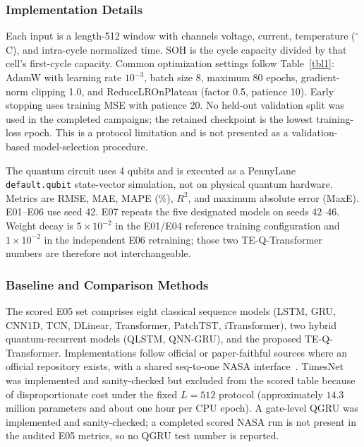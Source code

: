 \documentclass[a4paper,fleqn]{cas-sc}
\begin{document}
\subsubsection{Implementation Details}
\label{sec:implementation_details}

Each input is a length-512 window with channels voltage, current, temperature ($^\circ$C), and intra-cycle normalized time. SOH is the cycle capacity divided by that cell's first-cycle capacity. Common optimization settings follow Table~\ref{tbl1}: AdamW with learning rate $10^{-3}$, batch size 8, maximum 80 epochs, gradient-norm clipping 1.0, and ReduceLROnPlateau (factor 0.5, patience 10). Early stopping uses training MSE with patience 20. No held-out validation split was used in the completed campaigns; the retained checkpoint is the lowest training-loss epoch. This is a protocol limitation and is not presented as a validation-based model-selection procedure.

The quantum circuit uses 4 qubits and is executed as a PennyLane \mbox{\texttt{default.qubit}} state-vector simulation, not on physical quantum hardware. Metrics are RMSE, MAE, MAPE (\%), $R^2$, and maximum absolute error (MaxE). E01--E06 use seed 42. E07 repeats the five designated models on seeds 42--46. Weight decay is $5\times10^{-2}$ in the E01/E04 reference training configuration and $1\times10^{-2}$ in the independent E06 retraining; those two TE-Q-Transformer numbers are therefore not interchangeable.

\subsubsection{Baseline and Comparison Methods}
\label{sec:baseline_comparison}

The scored E05 set comprises eight classical sequence models (LSTM, GRU, CNN1D, TCN, DLinear, Transformer, PatchTST, iTransformer), two hybrid quantum-recurrent models (QLSTM, QNN-GRU), and the proposed TE-Q-Transformer. Implementations follow official or paper-faithful sources where an official repository exists, with a shared seq-to-one NASA interface~\citep{wang2024state,zhang2023accurate,giuliano2025transformer,soon2025hybrid,wang2026prediction}. TimesNet was implemented and sanity-checked but excluded from the scored table because of disproportionate cost under the fixed $L=512$ protocol (approximately $14.3$ million parameters and about one hour per CPU epoch). A gate-level QGRU was implemented and sanity-checked; a completed scored NASA run is not present in the audited E05 metrics, so no QGRU test number is reported.
\end{document}
